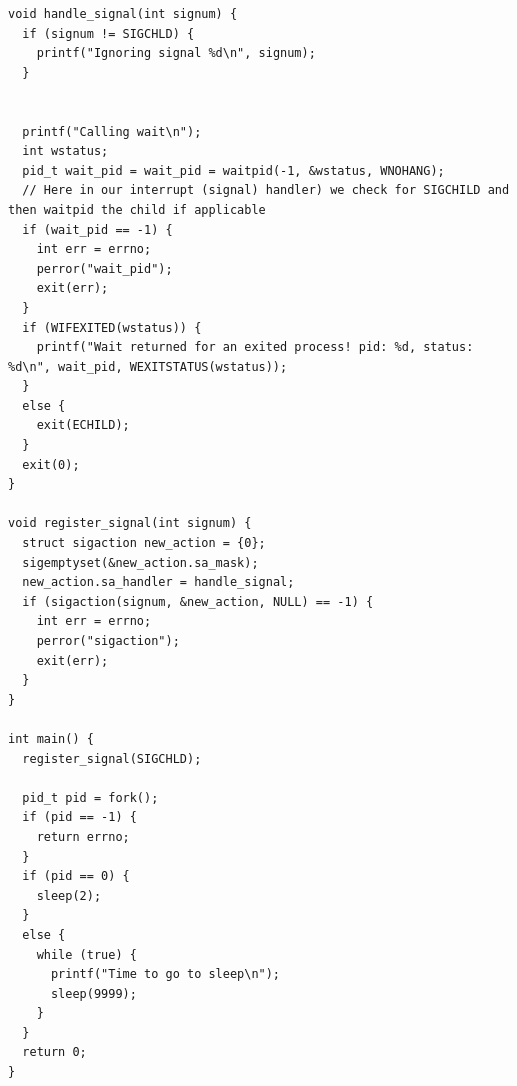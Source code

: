 \documentclass[../notes.tex]{subfiles}
\begin{document}
\begin{listing}[H]
\begin{verbatim}
void handle_signal(int signum) {
  if (signum != SIGCHLD) {
    printf("Ignoring signal %d\n", signum);
  }


  printf("Calling wait\n");
  int wstatus;
  pid_t wait_pid = wait_pid = waitpid(-1, &wstatus, WNOHANG);
  // Here in our interrupt (signal) handler) we check for SIGCHILD and then waitpid the child if applicable
  if (wait_pid == -1) {
    int err = errno;
    perror("wait_pid");
    exit(err);
  }
  if (WIFEXITED(wstatus)) {
    printf("Wait returned for an exited process! pid: %d, status: %d\n", wait_pid, WEXITSTATUS(wstatus));
  }
  else {
    exit(ECHILD);
  }
  exit(0);
}

void register_signal(int signum) {
  struct sigaction new_action = {0};
  sigemptyset(&new_action.sa_mask);
  new_action.sa_handler = handle_signal;
  if (sigaction(signum, &new_action, NULL) == -1) {
    int err = errno;
    perror("sigaction");
    exit(err);
  }
}

int main() {
  register_signal(SIGCHLD);

  pid_t pid = fork();
  if (pid == -1) {
    return errno;
  }
  if (pid == 0) {
    sleep(2);
  }
  else {
    while (true) {
      printf("Time to go to sleep\n");
      sleep(9999);
    }
  }
  return 0;
}
\end{verbatim}
\end{listing}
\end{document}
